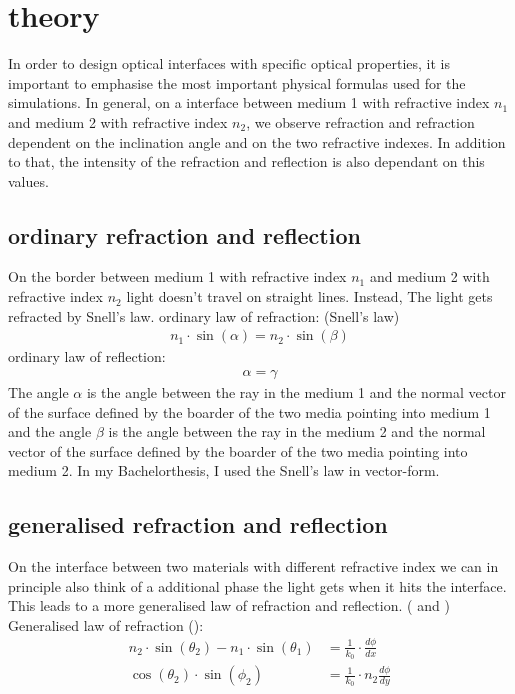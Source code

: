 \section{theory}
In order to design optical interfaces with specific optical properties, it is important to emphasise the most important physical formulas used for the simulations. In general, on a interface between medium 1 with refractive index $n_1$ and medium 2 with refractive index $n_2$, we observe refraction and refraction dependent on the inclination angle and on the two refractive indexes. In addition to that, the intensity of the refraction and reflection is also dependant on this values. 
\subsection{ordinary refraction and reflection \label{Snells_law_ordinary}}
On the border between medium 1 with refractive index $n_1$ and medium 2 with refractive index $n_2$ light doesn't travel on straight lines. Instead, The light gets refracted by Snell's law. 
ordinary law of refraction: (Snell's law)
\begin{align*}
n_1 \cdot \sin(\alpha) = n_2 \cdot \sin(\beta)
\end{align*}
ordinary law of reflection:
\begin{align*}
\alpha=\gamma
\end{align*}
The angle $\alpha$ is the angle between the ray in the medium 1 and the normal vector of the surface defined by the boarder of the two media pointing into medium 1 and the angle $\beta$ is the angle between the ray in the medium 2 and the normal vector of the surface defined by the boarder of the two media pointing into medium 2. 
In my Bachelorthesis, I used the Snell's law in vector-form. 
\subsection{generalised refraction and reflection \label{Snalls_law_generalised}}
On the interface between two materials with different refractive index we can in principle also think of a additional phase the light gets when it hits the interface. This leads to a more generalised law of refraction and reflection. (\cite{yu2011light} and \cite{yu2014flat})
Generalised law of refraction (\cite{yu2014flat}):
\begin{align*}
 n_2 \cdot \sin(\theta_2) - n_1 \cdot \sin(\theta_1) &= \frac{1}{k_0} \cdot \frac{d \phi}{dx} \\
 \cos(\theta_2) \cdot \sin(\phi_2) &=\frac{1}{k_0} \cdot n_2 \frac{d \phi}{dy}
\end{align*}

